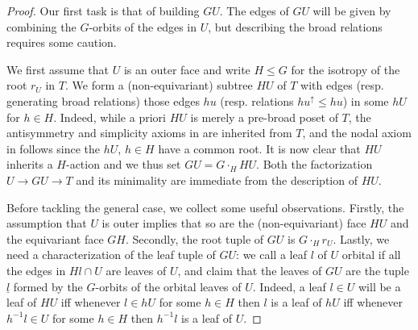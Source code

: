 \documentclass[a4paper,10pt,draft]{article}%
\numberwithin{equation}{section}%
\begin{document}
\begin{proof}
	Our first task is that of building $GU$. The edges of $GU$ will be given by combining 
	the $G$-orbits of the edges in $U$, but describing the broad relations requires some caution.

	We first assume that $U$ is an outer face and write	$H \leq G$ for the isotropy of the root $r_U$ in $T$.
	We form a (non-equivariant) subtree $HU$ of $T$ with edges (resp. generating broad relations) those edges
	$h u$ (resp. relations $h u^{\uparrow} \leq hu$) in some $hU$ for $h \in H$.
	Indeed, while a priori $HU$ is merely a pre-broad poset of $T$, the antisymmetry and simplicity axioms in \cite[Defs. 5.1 and 5.3]{Per17} are inherited from $T$, and the nodal axiom in
	\cite[Def. 5.9]{Per17} follows since the $h U$, $h \in H$ have a common root. It is now clear that $HU$ inherits a $H$-action and we thus set $GU = G \cdot_H HU$.
	Both the factorization $U \to GU \to T$ and its minimality are immediate from the description of $HU$.
	
	Before tackling the general case, we collect some useful observations. Firstly, the assumption that $U$ is outer implies that so are the (non-equivariant) face $HU$ and the equivariant face $GH$. Secondly, the root tuple of 
	$GU$ is $G\cdot_H r_U$.
	Lastly, we need a characterization of the leaf tuple of $GU$: we call a leaf $l$ of $U$ orbital if 
all the edges in $Hl \cap U$ are leaves of $U$, 
	and claim that the leaves of $GU$ are the tuple $\underline{l}$ formed by the $G$-orbits of the orbital leaves of $U$. Indeed, a leaf $l\in U$ will be a leaf of $HU$ iff whenever $l \in hU$ for some $h\in H$ then $l$ is a leaf of $hU$ iff
	whenever $h^{-1} l \in U$ for some $h\in H$ then $h^{-1}l$ is a leaf of $U$.
	

\end{proof}
\end{document}
